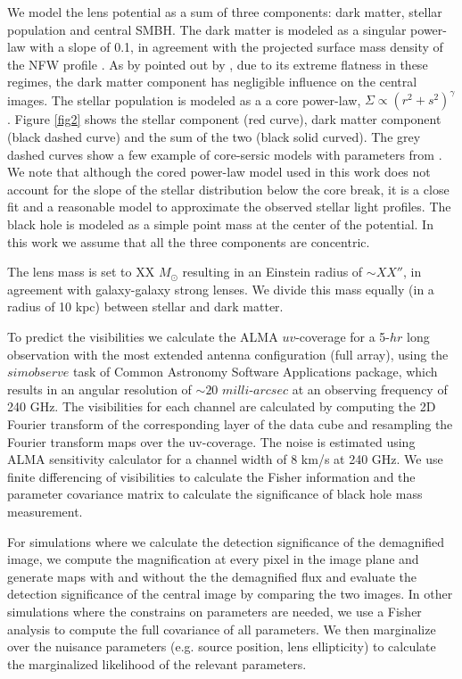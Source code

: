 \documentclass[chicago]{emulateapj}
\begin{document}
We model the lens potential as a sum of three components: dark matter, stellar population and central SMBH. The dark matter is modeled as a singular power-law with a slope of 0.1, in agreement with the projected surface mass density of the NFW profile \citep{}. As by pointed out by \citep{Keeton:03}, due to its extreme flatness in these regimes, the dark matter component has negligible influence on the central images. 
The stellar population is modeled as a a core power-law, $\Sigma\propto (r^2+s^2)^{\gamma}$. Figure \ref{fig2} shows the stellar component (red curve), dark matter component (black dashed curve) and the sum of the two (black solid curved). The grey dashed curves show a few example of core-sersic models with parameters from \citep{f06}. We note that although the cored power-law model used in this work does not account for the slope of the stellar distribution below the core break, it is a close fit and a reasonable model to approximate the observed stellar light profiles. 
The black hole is modeled as a simple point mass at the center of the potential. In this work we assume that all the three components are concentric.

The lens mass is set to XX $M_{\odot}$ resulting in an Einstein radius of $\sim XX''$, in agreement with galaxy-galaxy strong lenses. We divide this mass equally (in a radius of 10 kpc) between stellar and dark matter. 

To predict the visibilities we calculate the ALMA $uv$-coverage for a 5-$hr$ long observation with the most extended antenna configuration (full array), using the $simobserve$ task of Common Astronomy Software Applications package, which results in an angular resolution of $\sim20\, \, milli$-$arcsec$ at an observing frequency of 240 GHz. 
The visibilities for each channel are calculated by computing the 2D Fourier transform of the corresponding layer of the data cube and resampling the Fourier transform maps over the uv-coverage. 
The noise is estimated using ALMA sensitivity calculator for a channel width of 8 km/s at 240 GHz. 
We use finite differencing of visibilities to calculate the Fisher information and the parameter covariance matrix to calculate the significance of black hole mass measurement.


For simulations where we calculate the detection significance of the demagnified image, we compute the magnification at every pixel in the image plane and generate maps with and without the the demagnified flux and evaluate the detection significance of the central image by comparing the two images. In other simulations where the constrains on parameters are needed, we use a Fisher analysis to compute the full covariance of all parameters. We then marginalize over the nuisance parameters (e.g. source position, lens ellipticity) to calculate the marginalized likelihood of the relevant parameters. 
\end{document}
